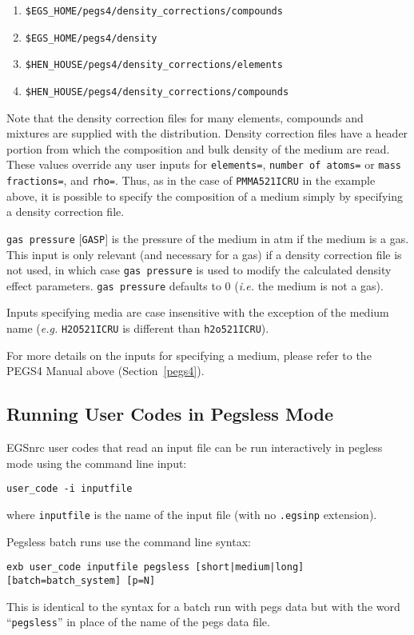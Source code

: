 \begin{description}
\begin{description}
\begin{enumerate}
\item {\tt \$EGS\_HOME/pegs4/density\_corrections/compounds}
\item {\tt \$EGS\_HOME/pegs4/density}
\item {\tt \$HEN\_HOUSE/pegs4/density\_corrections/elements}
\item {\tt \$HEN\_HOUSE/pegs4/density\_corrections/compounds}
\end{enumerate}
Note that the density correction files for many elements, compounds
and mixtures are supplied with
the distribution.  Density correction files have a header portion from which the composition and bulk density of the medium are read.  These values override
any user inputs for {\tt elements=}, {\tt number of atoms=} or {\tt mass fractions=}, and {\tt rho=}.  Thus, as in the case of
{\tt PMMA521ICRU} in the example above, it is possible to specify the composition
of a medium simply by specifying a density correction file.
\item {\tt gas pressure} $[${\tt GASP}$]$ is the pressure of the medium in atm
if the medium is a gas.  This input is only relevant (and necessary
for a gas) if
a density correction file is not used, in which case {\tt gas pressure} is used to modify the calculated density effect parameters.
{\tt gas pressure} defaults to 0 ({\em i.e.} the medium is not a gas).
\end{description}
\end{description}

Inputs specifying media are case insensitive with the exception of the medium name ({\it e.g.} {\tt H2O521ICRU} is
different than {\tt h2o521ICRU}).

For more details on the inputs for specifying a medium, please refer to the PEGS4 Manual above (Section~\ref{pegs4}).

\subsection {Running User Codes in Pegsless Mode}

EGSnrc user codes that read an input file can be run interactively in pegless mode using the command line input:
\begin{verbatim}
user_code -i inputfile
\end{verbatim}
where {\tt inputfile} is the name of the input file (with no
{\tt .egsinp} extension).

Pegsless batch runs use the command line syntax:
\begin{verbatim}
exb user_code inputfile pegsless [short|medium|long] [batch=batch_system] [p=N]
\end{verbatim}
This is identical to the syntax for a batch run with pegs data but
with the word ``{\tt pegsless}'' in place of the name of the pegs data file.

